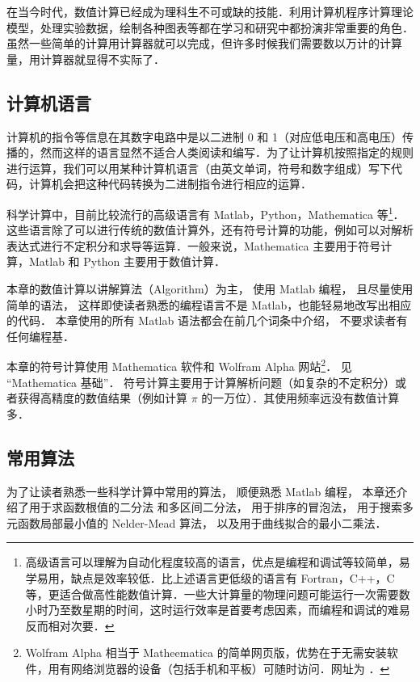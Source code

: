 
在当今时代，数值计算已经成为理科生不可或缺的技能．利用计算机程序计算理论模型，处理实验数据，绘制各种图表等都在学习和研究中都扮演非常重要的角色．虽然一些简单的计算用计算器就可以完成，但许多时候我们需要数以万计的计算量，用计算器就显得不实际了．

\subsection{计算机语言}
计算机的指令等信息在其数字电路中是以二进制 0 和 1（对应低电压和高电压）传播的，然而这样的语言显然不适合人类阅读和编写．为了让计算机按照指定的规则进行运算，我们可以用某种计算机语言（由英文单词，符号和数字组成）写下代码，计算机会把这种代码转换为二进制指令进行相应的运算．

科学计算中，目前比较流行的高级语言有 Matlab，Python，Mathematica 等\footnote{高级语言可以理解为自动化程度较高的语言，优点是编程和调试等较简单，易学易用，缺点是效率较低．比上述语言更低级的语言有 Fortran，C++，C 等，更适合做高性能数值计算．一些大计算量的物理问题可能运行一次需要数小时乃至数星期的时间，这时运行效率是首要考虑因素，而编程和调试的难易反而相对次要．}．这些语言除了可以进行传统的数值计算外，还有符号计算的功能，例如可以对解析表达式进行不定积分和求导等运算．一般来说，Mathematica 主要用于符号计算，Matlab 和 Python 主要用于数值计算．

本章的数值计算以讲解算法（Algorithm）为主， 使用 Matlab 编程， 且尽量使用简单的语法， 这样即使读者熟悉的编程语言不是 Matlab，也能轻易地改写出相应的代码． 本章使用的所有 Matlab 语法都会在前几个词条中介绍， 不要求读者有任何编程基．

本章的符号计算使用 Mathematica 软件和 Wolfram Alpha 网站\footnote{Wolfram Alpha 相当于 Matheematica 的简单网页版，优势在于无需安装软件，用有网络浏览器的设备（包括手机和平板）可随时访问．网址为 ．}． 见 “Mathematica 基础”．%
符号计算主要用于计算解析问题（如复杂的不定积分）或者获得高精度的数值结果（例如计算 $\pi$ 的一万位）．其使用频率远没有数值计算多．

\subsection{常用算法}
为了让读者熟悉一些科学计算中常用的算法， 顺便熟悉 Matlab 编程， 本章还介绍了用于求函数根值的二分法 和多区间二分法， 用于排序的冒泡法， 用于搜索多元函数局部最小值的 Nelder-Mead 算法， 以及用于曲线拟合的最小二乘法．%

